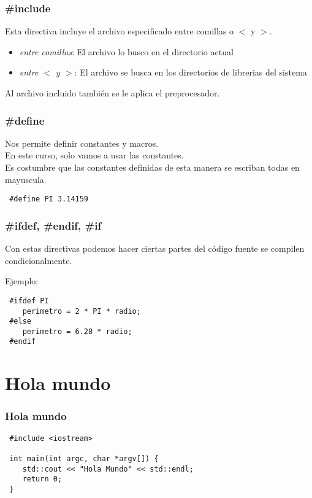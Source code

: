 \documentclass{beamer}
\begin{document}
\begin{frame}
\frametitle{\#include}
Esta directiva incluye el archivo especificado entre comillas o $<$ y $>$.
\begin{itemize}
 \item \emph{entre comillas}: El archivo lo busco en el directorio actual
 \item \emph{entre $<$ y $>$}: El archivo se busca en los directorios de librerias del sistema 
\end{itemize}
Al archivo incluido también se le aplica el preprocesador.
\end{frame}

\begin{frame}[fragile]
\frametitle{\#define}
Nos permite definir constantes y macros. \\
En este curso, solo vamos a usar las constantes. \\
Es costumbre que las constantes definidas de esta manera se escriban todas en mayuscula.

\begin{verbatim}
 #define PI 3.14159
\end{verbatim}

\end{frame}

\begin{frame}[fragile]
\frametitle{\#ifdef, \#endif, \#if}

Con estas directivas podemos hacer ciertas partes del código fuente se compilen
condicionalmente.

Ejemplo:
\begin{verbatim}
 #ifdef PI
    perimetro = 2 * PI * radio; 
 #else
    perimetro = 6.28 * radio;
 #endif
\end{verbatim}

\end{frame}

\section{Hola mundo}

\begin{frame}[fragile]
\frametitle{Hola mundo}

\begin{verbatim}
 #include <iostream>
 
 int main(int argc, char *argv[]) {
    std::cout << "Hola Mundo" << std::endl;
    return 0;
 }
\end{verbatim}

\end{frame}
\end{document}

